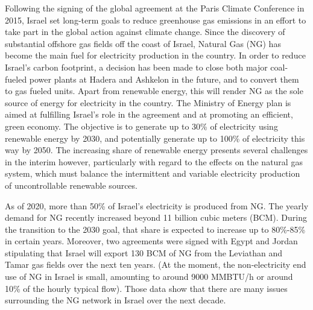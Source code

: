 


Following the signing of the global agreement at the Paris Climate Conference in 2015, Israel set long-term goals to reduce greenhouse gas emissions in an effort to take part in the global action against climate change. Since the discovery of substantial offshore gas fields off the coast of Israel, Natural Gas (NG) has become the main fuel for electricity production in the country. In order to reduce Israel's carbon footprint, a decision has been made to close both major coal-fueled power plants at Hadera and Ashkelon in the future, and to convert them to gas fueled units. Apart from  renewable energy, this will render NG as the sole source of energy for electricity in the country. The Ministry of Energy plan is aimed at fulfilling Israel’s role in the agreement and at promoting an efficient, green economy. The objective is to generate up to 30\% of electricity using renewable energy by 2030, and potentially generate up to 100\% of electricity this way by 2050. The increasing share of renewable energy presents several challenges in the interim however, particularly with regard to the effects on the natural gas system, which must balance the intermittent and variable electricity production of uncontrollable renewable sources.

As of 2020, more than 50\% of Israel's electricity is produced from NG. The yearly demand for NG recently increased beyond 11 billion cubic meters (BCM). During the transition to the 2030 goal, that share is expected to increase up to 80\%-85\% in certain years. Moreover, two agreements were signed with Egypt and Jordan stipulating that Israel will export 130 BCM of NG from the Leviathan and Tamar gas fields over the next ten years. (At the moment, the non-electricity end use of NG in Israel is small, amounting to around 9000 MMBTU/h or around 10\% of the hourly typical flow).
Those data show that there are many issues surrounding the NG network in Israel over the next decade.


